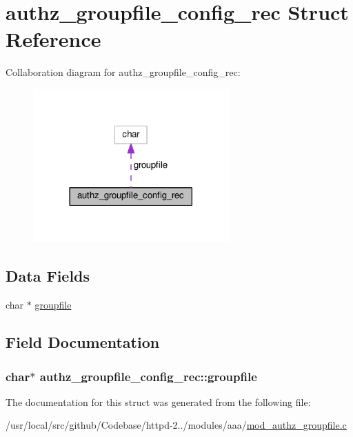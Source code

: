 \hypertarget{structauthz__groupfile__config__rec}{}\section{authz\+\_\+groupfile\+\_\+config\+\_\+rec Struct Reference}
\label{structauthz__groupfile__config__rec}


Collaboration diagram for authz\+\_\+groupfile\+\_\+config\+\_\+rec\+:
\nopagebreak
\begin{figure}[H]
\begin{center}
\leavevmode
\includegraphics[width=213pt]{structauthz__groupfile__config__rec__coll__graph}
\end{center}
\end{figure}
\subsection*{Data Fields}
\begin{DoxyCompactItemize}
\item 
char $\ast$ \hyperlink{structauthz__groupfile__config__rec_aabee5845e8cf2efaceb275ee5c4e1af0}{groupfile}
\end{DoxyCompactItemize}


\subsection{Field Documentation}
\subsubsection[{\texorpdfstring{groupfile}{groupfile}}]{\setlength{\rightskip}{0pt plus 5cm}char$\ast$ authz\+\_\+groupfile\+\_\+config\+\_\+rec\+::groupfile}\hypertarget{structauthz__groupfile__config__rec_aabee5845e8cf2efaceb275ee5c4e1af0}{}\label{structauthz__groupfile__config__rec_aabee5845e8cf2efaceb275ee5c4e1af0}


The documentation for this struct was generated from the following file\+:\begin{DoxyCompactItemize}
\item 
/usr/local/src/github/\+Codebase/httpd-\/2../modules/aaa/\hyperlink{mod__authz__groupfile_8c}{mod\+\_\+authz\+\_\+groupfile.\+c}\end{DoxyCompactItemize}
